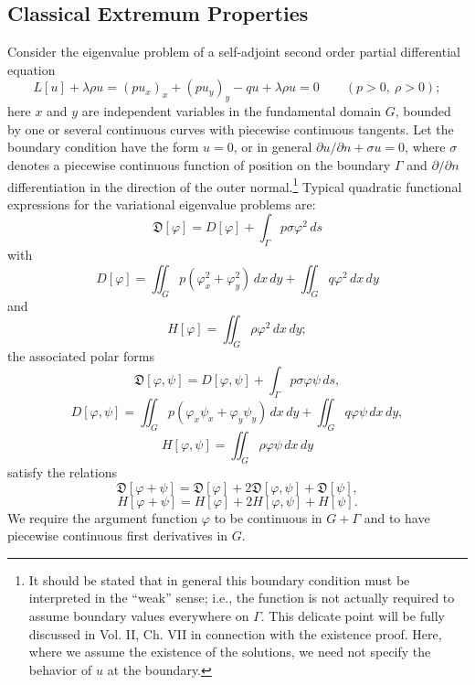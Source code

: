 \subsection{Classical Extremum Properties}
Consider the eigenvalue problem of a self-adjoint second order partial differential equation
\begin{equation}\tag{1}
L[u]+\lambda\rho u=(pu_x)_x+(pu_y)_y-qu+\lambda\rho u=0
\qquad (p>0,\ \rho>0);
\end{equation}
here $x$ and $y$ are independent variables in the fundamental domain $G$, bounded by one or several continuous curves with piecewise continuous tangents. Let the boundary condition have the form $u=0$, or in general $\partial u/\partial n+\sigma u=0$, where $\sigma$ denotes a piecewise continuous function of position on the boundary $\Gamma$ and $\partial/\partial n$ differentiation in the direction of the outer normal.\footnote{It should be stated that in general this boundary condition must be interpreted in the ``weak'' sense; i.e., the function is not actually required to assume boundary values everywhere on $\Gamma$. This delicate point will be fully discussed in Vol. II, Ch. VII in connection with the existence proof. Here, where we assume the existence of the solutions, we need not specify the behavior of $u$ at the boundary.} Typical quadratic functional expressions for the variational eigenvalue problems are:
\begin{equation}\tag{2}
\mathfrak D[\varphi]=D[\varphi]+\int_\Gamma p\sigma\varphi^2\,ds
\end{equation}
with
\begin{equation}\tag{2a}
D[\varphi]=\iint_G p(\varphi_x^2+\varphi_y^2)\,dx\,dy+\iint_G q\varphi^2\,dx\,dy
\end{equation}
and
\begin{equation}\tag{3}
H[\varphi]=\iint_G \rho\varphi^2\,dx\,dy;
\end{equation}
the associated polar forms
\[
\mathfrak D[\varphi,\psi]=D[\varphi,\psi]+\int_\Gamma p\sigma\varphi\psi\,ds,
\]
\[
D[\varphi,\psi]=\iint_G p(\varphi_x\psi_x+\varphi_y\psi_y)\,dx\,dy+\iint_G q\varphi\psi\,dx\,dy,
\]
\[
H[\varphi,\psi]=\iint_G \rho\varphi\psi\,dx\,dy
\]
satisfy the relations
\[
\mathfrak D[\varphi+\psi]=\mathfrak D[\varphi]+2\mathfrak D[\varphi,\psi]+\mathfrak D[\psi],
\]
\[
H[\varphi+\psi]=H[\varphi]+2H[\varphi,\psi]+H[\psi].
\]
We require the argument function $\varphi$ to be continuous in $G+\Gamma$ and to have piecewise continuous first derivatives in $G$.

